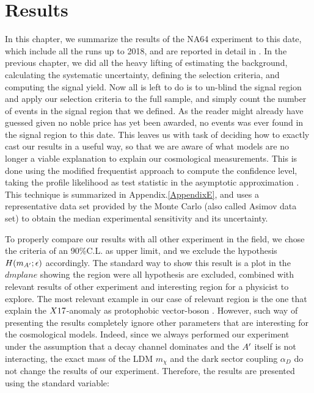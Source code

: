
\newcommand{\pdirfour}{chapters/plots/chapter4}

\chapter{Results} %

\label{chapter4} %

In this chapter, we summarize the results of the NA64 experiment to this date, which include all the runs up to 2018, and are reported in detail in \cite{Banerjee:2020fue,Banerjee:2019hmi,NA64:2019imj,na64-prd,Banerjee:2018vgk,Banerjee:2016tad}. In the previous chapter, we did all the heavy lifting of estimating the background, calculating the systematic uncertainty, defining the selection criteria, and computing the signal yield. Now all is left to do is to un-blind the signal region and apply our selection criteria to the full sample, and simply count the number of events in the signal region that we defined. As the reader might already have guessed given no noble price has yet been awarded, no events was ever found in the signal region to this date. This leaves us with task of deciding how to exactly cast our results in a useful way, so that we are aware of what models are no longer a viable explanation to explain our cosmological measurements. This is done using the modified frequentist approach to compute the confidence level, taking the profile likelihood as test statistic in the asymptotic approximation \cite{Read_2002,JUNK1999435,Cowan:2010js}. This technique is summarized in Appendix.\ref{AppendixE}, and uses a representative data set provided by the Monte Carlo (also called Asimov data set) to obtain the median experimental sensitivity and its uncertainty.

To properly compare our results with all other experiment in the field, we chose the criteria of an 90\%C.L. as upper limit, and we exclude the hypothesis $H(m_{A'};\epsilon)$ accordingly. The standard way to show this result is a plot in the $dmplane$ showing the region were all hypothesis are excluded, combined with relevant results of other experiment and interesting region for a physicist to explore. The most relevant example in our case of relevant region is the one that explain the $X17$-anomaly as protophobic vector-boson \cite{PhysRevD.95.035017}. However, such way of presenting the results completely ignore other parameters that are interesting for the cosmological models. Indeed, since we always performed our experiment under the assumption that a decay channel dominates and the $A'$ itself is not interacting, the exact mass of the LDM $m_{\chi}$ and the dark sector coupling $\alpha_D$ do not change the results of our experiment. Therefore, the results are presented using the standard variable:

